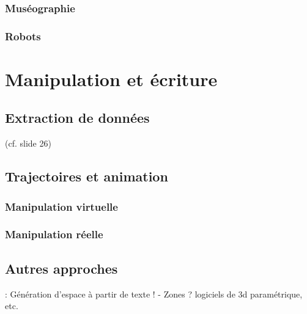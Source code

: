 \documentclass[french,12pt]{article}
\begin{document}
\subsubsection{Muséographie}
\cite{adhitya_composing_2012}
\cite{michael_comparative_2010}
\cite{azough_modeet_2014}
\cite{kidd_multi-touch_2011}
\subsubsection{Robots}
\cite{lee_virtual_2014} %

\section{Manipulation et écriture}

\subsection{Extraction de données}
\cite{li_aesthetic_2009} (cf. slide 26)
\subsection{Trajectoires et animation}
\cite{santosa_direct_2013}
\cite{kazi_kitty:_2014,scott_physink:_2013}

\cite{garcia_jeremie_processing_2015,garcia_towards_2015}
\cite{wakefield_cosm:_2011}
\cite{wagner_introducing_2014}
\cite{melchior_authoring_2005} 
\cite{bresson_spatial_2012}
\cite{wozniewski_spatosc:_2012}
\cite{favory_trajectoires:_2015}
\cite{casas_4d_2013}


\subsubsection{Manipulation virtuelle}
\cite{jacob_design_2014} %
\cite{cohen_interface_1999}
\subsubsection{Manipulation réelle}
\cite{grossman_interface_2003}


\subsection{Autres approches}
\cite{andriamarozakaniaina_du_2012} : Génération d'espace à partir de texte !
\cite{van_nort_lom_2006}
 - Zones ? logiciels de 3d paramétrique, etc.
\end{document}
